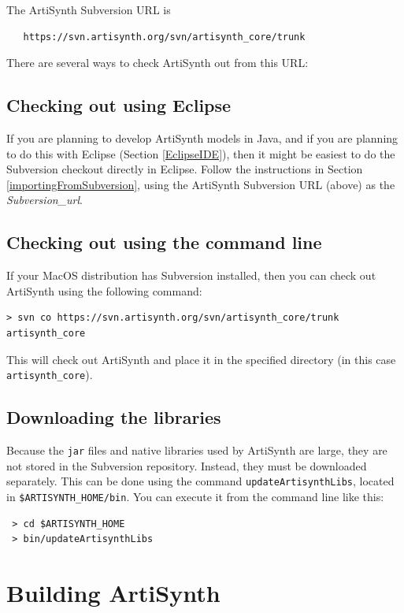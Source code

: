 \documentclass{article}
\def\SEP{/}
\def\SYSTEM{MacOS }
\def\directory{directory }
\begin{document}
The ArtiSynth Subversion URL is
\begin{verbatim}
   https://svn.artisynth.org/svn/artisynth_core/trunk
\end{verbatim}
There are several ways to check ArtiSynth out from this URL:

\subsection{Checking out using Eclipse}
\label{ArtiSynthEclipseCheckout}

If you are planning to develop ArtiSynth models in Java, and if you
are planning to do this with Eclipse (Section \ref{EclipseIDE}), then
it might be easiest to do the Subversion checkout directly in Eclipse.
Follow the instructions in Section \ref{importingFromSubversion},
using the ArtiSynth Subversion URL (above) as the {\it
Subversion\_url}.

\subsection{Checking out using the command line}
\label{ArtiSynthCygwinCheckout}

If your \SYSTEM distribution has Subversion installed, then you can
check out ArtiSynth using the following command:

\begin{lstlisting}
> svn co https://svn.artisynth.org/svn/artisynth_core/trunk artisynth_core
\end{lstlisting}

This will check out ArtiSynth and place it in the specified \directory 
(in this case {\tt artisynth\_core}).

\subsection{Downloading the libraries}
\label{DownloadingLibraries}

Because the {\tt jar} files and native libraries used by ArtiSynth
are large, they are not stored in the Subversion repository.
Instead, they must be downloaded separately. This can be
done using the command {\tt updateArtisynthLibs}, located
in {\tt \$ARTISYNTH\_HOME\SEP bin}. You can execute it
from the command line like this:
\begin{verbatim}
 > cd $ARTISYNTH_HOME
 > bin/updateArtisynthLibs
\end{verbatim}

\section{Building ArtiSynth}
\label{Building}
\end{document}
